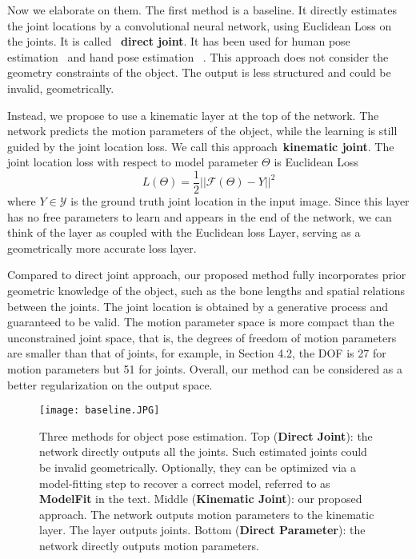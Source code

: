 \documentclass[runningheads]{llncs}
\begin{document}
Now we elaborate on them. The first method is a baseline. It directly estimates the joint locations by a convolutional neural network, using Euclidean Loss on the joints. It is called ~\textbf{direct joint}. It has been used for human pose estimation~\cite{toshev2014deeppose,li20143d} and hand pose estimation ~\cite{oberweger2015hands}. This approach does not consider the geometry constraints of the object. The output is less structured and could be invalid, geometrically.

Instead, we propose to use a kinematic layer at the top of the network. The network predicts the motion parameters of the object, while the learning is still guided by the joint location loss. We call this approach~\textbf{kinematic joint}. The joint location loss with respect to model parameter $\Theta$ is Euclidean Loss
\begin{equation} \label{eq:loss}
L(\Theta) = \frac{1}{2}||\mathcal{F}(\Theta) - Y||^2
\end{equation}
where $Y \in \mathcal{Y}$ is the ground truth joint location in the input image. Since this layer has no free parameters to learn and appears in the end of the network, we can think of the layer as coupled with the Euclidean loss Layer, serving as a geometrically more accurate loss layer.

Compared to direct joint approach, our proposed method fully incorporates prior geometric knowledge of the object, such as the bone lengths and spatial relations between the joints. The joint location is obtained by a generative process and guaranteed to be valid. The motion parameter space is more compact than the unconstrained joint space, that is, the degrees of freedom of motion parameters are smaller than that of joints, for example, in Section 4.2, the DOF is 27 for motion parameters but 51 for joints. Overall, our method can be considered as a better regularization on the output space.

\begin{figure}
\begin{center}
\texttt{[image: baseline.JPG]}
\end{center}
   \caption{Three methods for object pose estimation. Top (\textbf{Direct Joint}): the network directly outputs all the joints. Such estimated joints could be invalid geometrically. Optionally, they can be optimized via a model-fitting step to recover a correct model, referred to as \textbf{ModelFit} in the text. Middle (\textbf{Kinematic Joint}): our proposed approach. The network outputs motion parameters to the kinematic layer. The layer outputs joints. Bottom (\textbf{Direct Parameter}): the network directly outputs motion parameters.}
\label{fig:methods}
\end{figure}
\end{document}
